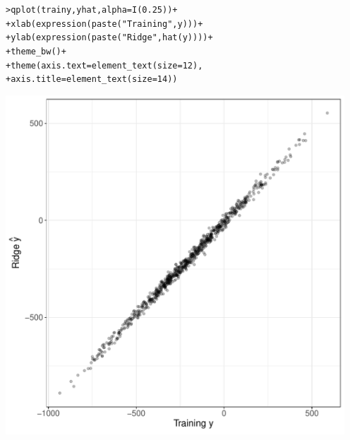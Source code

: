 \documentclass[12pt]{article}\usepackage[]{graphicx}\usepackage[]{color}
\makeatletter
\newcommand{\hlnum}[1]{\textcolor[rgb]{0.82,0.78,0.62}{#1}}%
\newcommand{\hlstr}[1]{\textcolor[rgb]{0.82,0.78,0.62}{#1}}%
\newcommand{\hlopt}[1]{\textcolor[rgb]{0.882,0.878,0.898}{#1}}%
\newcommand{\hlstd}[1]{\textcolor[rgb]{0.882,0.878,0.898}{#1}}%
\newcommand{\hlkwc}[1]{\textcolor[rgb]{0.812,0.522,0.388}{#1}}%
\newcommand{\hlkwd}[1]{\textcolor[rgb]{0.733,0.388,0.812}{#1}}%
\newenvironment{kframe}{%
 \def\at@end@of@kframe{}%
 \ifinner\ifhmode%
  \def\at@end@of@kframe{\end{minipage}}%
  \begin{minipage}{\columnwidth}%
 \fi\fi%
 \def\FrameCommand##1{\hskip\@totalleftmargin \hskip-\fboxsep
 \colorbox{shadecolor}{##1}\hskip-\fboxsep
     \hskip-\linewidth \hskip-\@totalleftmargin \hskip\columnwidth}%
 \MakeFramed {\advance\hsize-\width
   \@totalleftmargin\z@ \linewidth\hsize
   \@setminipage}}%
 {\par\unskip\endMakeFramed%
 \at@end@of@kframe}
\newenvironment{knitrout}{}{} %
\makeatother
\begin{document}
\begin{flushleft}
\begin{center}
\begin{knitrout}
\begin{kframe}
\begin{alltt}
\hlstd{> }\hlkwd{qplot}\hlstd{(trainy, yhat,} \hlkwc{alpha}\hlstd{=}\hlkwd{I}\hlstd{(}\hlnum{0.25}\hlstd{))}\hlopt{+}
\hlstd{+ }     \hlkwd{xlab}\hlstd{(} \hlkwd{expression}\hlstd{(}\hlkwd{paste}\hlstd{(}\hlstr{"Training "}\hlstd{, y)))}\hlopt{+}
\hlstd{+ }     \hlkwd{ylab}\hlstd{(} \hlkwd{expression}\hlstd{(}\hlkwd{paste}\hlstd{(}\hlstr{"Ridge "}\hlstd{,} \hlkwd{hat}\hlstd{(y))))}\hlopt{+}
\hlstd{+ }     \hlkwd{theme_bw}\hlstd{()}\hlopt{+}
\hlstd{+ }     \hlkwd{theme}\hlstd{(}\hlkwc{axis.text} \hlstd{=} \hlkwd{element_text}\hlstd{(}\hlkwc{size}\hlstd{=}\hlnum{12}\hlstd{),}
\hlstd{+ }          \hlkwc{axis.title} \hlstd{=} \hlkwd{element_text}\hlstd{(}\hlkwc{size}\hlstd{=}\hlnum{14}\hlstd{))}
\end{alltt}
\end{kframe}
\includegraphics[width=5in]{figure/LASSO1ML-1} 

\end{knitrout}
\end{center}


\end{flushleft}
\end{document}
